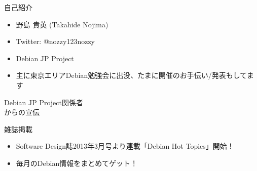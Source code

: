 \begin{frame}{自己紹介}
\begin{itemize}
\item 野島 貴英 (Takahide Nojima)
\item Twitter: @nozzy123nozzy
\item Debian JP Project
\item 主に東京エリアDebian勉強会に出没、たまに開催のお手伝い/発表もしてます
\end{itemize}
\end{frame}

\begin{frame}
\begin{center}
\LARGE{Debian JP Project関係者\\からの宣伝}
\end{center}
\end{frame}

\begin{frame}{雑誌掲載}
\Large
\begin{itemize}
\item Software Design誌2013年3月号より連載「Debian Hot Topics」開始！
\item 毎月のDebian情報をまとめてゲット！\\
\end{itemize}
\end{frame}


